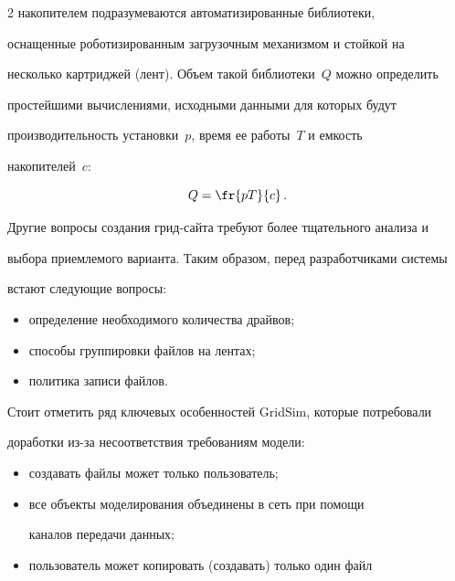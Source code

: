 \begin{multicols}{2}
накопителем подразумеваются автоматизированные биб\-лио\-те\-ки, 


оснащенные роботизированным загрузочным механизмом и стойкой на 


несколько картриджей (лент). Объем такой биб\-лио\-те\-ки~$Q$ можно определить 


простейшими вы\-чис\-ле\-ни\-ями, исходными данными для которых будут 


производительность установки~$p$, время ее работы~$T$ и емкость 


накопителей~$c$:


   $$


   Q=\fr{pT}{c}\,.


   $$


   


   Другие вопросы создания грид-сай\-та требуют более тщательного анализа и 


выбора приемлемого варианта. Таким образом, перед разработчиками системы 


встают следующие вопросы:


   \begin{itemize}


   \item определение необходимого количества драйвов;


\item способы группировки файлов на лентах;


\item политика записи файлов.


\end{itemize}





   Стоит отметить ряд ключевых особенностей GridSim, которые потребовали 


доработки из-за несоответствия требованиям модели: 


   \begin{itemize}


   \item создавать файлы может только пользователь;


\item все объекты моделирования объединены в сеть при помощи 


каналов передачи данных;


\item пользователь может копировать (создавать) только один файл 



\end{itemize}
\end{multicols}
